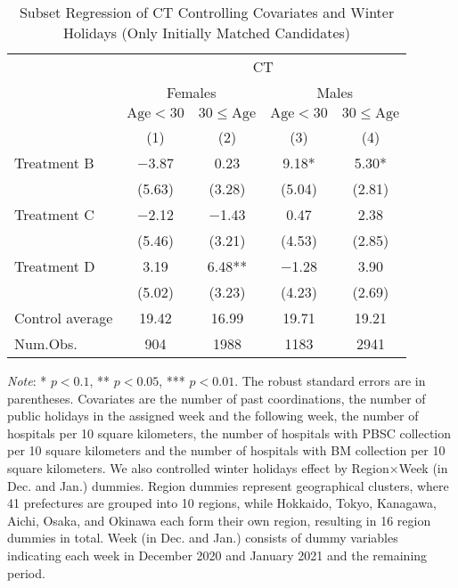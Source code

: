 \documentclass[12pt, a4paper]{article}
\begin{document}
\begin{table}[H]

\caption{\label{tab:lm-test-subset3-init}Subset Regression of CT Controlling Covariates and Winter Holidays (Only Initially Matched Candidates)}
\centering
\fontsize{8}{10}\selectfont
\begin{threeparttable}
\begin{tabular}[t]{lcccc}
\toprule
\multicolumn{1}{c}{ } & \multicolumn{4}{c}{CT} \\
\cmidrule(l{3pt}r{3pt}){2-5}
\multicolumn{1}{c}{ } & \multicolumn{2}{c}{Females} & \multicolumn{2}{c}{Males} \\
\cmidrule(l{3pt}r{3pt}){2-3} \cmidrule(l{3pt}r{3pt}){4-5}
\multicolumn{1}{c}{ } & \multicolumn{1}{c}{$\text{Age} < 30$} & \multicolumn{1}{c}{$30 \le \text{Age}$} & \multicolumn{1}{c}{$\text{Age} < 30$} & \multicolumn{1}{c}{$30 \le \text{Age}$} \\
\cmidrule(l{3pt}r{3pt}){2-2} \cmidrule(l{3pt}r{3pt}){3-3} \cmidrule(l{3pt}r{3pt}){4-4} \cmidrule(l{3pt}r{3pt}){5-5}
  & (1) & (2) & (3) & (4)\\
\midrule
Treatment B & \num{-3.87} & \num{0.23} & \num{9.18}* & \num{5.30}*\\
 & (\num{5.63}) & (\num{3.28}) & (\num{5.04}) & (\num{2.81})\\
Treatment C & \num{-2.12} & \num{-1.43} & \num{0.47} & \num{2.38}\\
 & (\num{5.46}) & (\num{3.21}) & (\num{4.53}) & (\num{2.85})\\
Treatment D & \num{3.19} & \num{6.48}** & \num{-1.28} & \num{3.90}\\
 & (\num{5.02}) & (\num{3.23}) & (\num{4.23}) & (\num{2.69})\\
\midrule
Control average & 19.42 & 16.99 & 19.71 & 19.21\\
Num.Obs. & \num{904} & \num{1988} & \num{1183} & \num{2941}\\
\bottomrule
\end{tabular}
\begin{tablenotes}
\item \emph{Note}: * $p < 0.1$, ** $p < 0.05$, *** $p < 0.01$. The robust standard errors are in parentheses. Covariates are the number of past coordinations, the number of public holidays in the assigned week and the following week, the number of hospitals per 10 square kilometers, the number of hospitals with PBSC collection per 10 square kilometers and the number of hospitals with BM collection per 10 square kilometers. We also controlled winter holidays effect by Region$\times$Week (in Dec. and Jan.) dummies. Region dummies represent geographical clusters, where 41 prefectures are grouped into 10 regions, while Hokkaido, Tokyo, Kanagawa, Aichi, Osaka, and Okinawa each form their own region, resulting in 16 region dummies in total. Week (in Dec. and Jan.) consists of dummy variables indicating each week in December 2020 and January 2021 and the remaining period.
\end{tablenotes}
\end{threeparttable}
\end{table}
\end{document}
